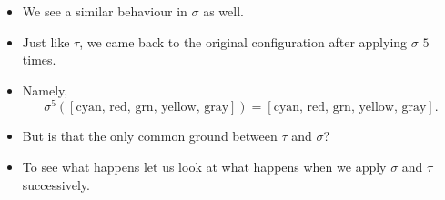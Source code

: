 \documentclass[ %
 10pt, xcolor={dvipsnames,svgnames,x11names,hyperref},
   hyperref={colorlinks=true,citecolor=green,linkcolor=DarkRed,urlcolor=ProcessBlue,anchorcolor=blue}
  ]{beamer}
\newenvironment{stepitemize}{\begin{itemize}[<+->]}{\end{itemize} }
\begin{document}
\begin{frame}
\begin{stepitemize}
    \item We see a similar behaviour in $\sigma$ as well.
    \item Just like $\tau$, we came back to the original configuration after applying $\sigma $ $5$ times.
    \item Namely,
$$\sigma^5([\textrm{cyan, red, grn, yellow, gray}]) = [\textrm{cyan, red, grn, yellow, gray}].$$
    \item But is that the only common ground between $\tau$ and $\sigma$?
    \item To see what happens let us look at what happens when we apply $\sigma$ and $\tau$ successively.
\end{stepitemize}

\end{frame}
\end{document}
